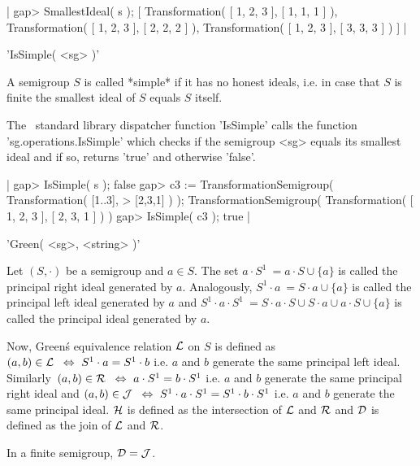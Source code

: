 |  gap> SmallestIdeal( s );
  [ Transformation( [ 1, 2, 3 ], [ 1, 1, 1 ] ), 
    Transformation( [ 1, 2, 3 ], [ 2, 2, 2 ] ), 
    Transformation( [ 1, 2, 3 ], [ 3, 3, 3 ] ) ]
|



'IsSimple( <sg> )'  

A semigroup $S$ is called *simple* if it has no honest ideals, i.e.
in case that $S$ is finite the smallest ideal of $S$ equals $S$ itself. 

The \GAP\ standard library dispatcher function 'IsSimple' calls the 
function 
'sg.\-op\-er\-a\-tions.\-Is\-Simple' which checks if the semigroup 
<sg> equals its smallest ideal and if so, returns 'true' and 
otherwise 'false'.

|  gap> IsSimple( s );                                                    
  false
  gap> c3 := TransformationSemigroup( Transformation( [1..3],            
  >                                   [2,3,1] ) );
  TransformationSemigroup( Transformation( [ 1, 2, 3 ], [ 2, 3, 1 ] ) ) 
  gap> IsSimple( c3 );
  true
|



'Green( <sg>, <string> )'  

Let $(S,\cdot)$ be a semigroup and $a \in S$. The set $a \cdot S^1 \:= 
a \cdot S \cup \{a\}$ is called the principal right ideal generated by $a$.
Analogously, $S^1 \cdot a \:= 
S \cdot a \cup \{a\}$ is called the principal left ideal generated by $a$
and  $S^1 \cdot a \cdot S^1 \:= 
S \cdot a \cdot S \cup S \cdot a \cup a \cdot S \cup \{a\}$ is called 
the principal ideal generated by $a$.

Now, Green\'s equivalence relation ${\cal L}$ on $S$ is defined as\:\
$(a,b) \in {\cal L}\:\ \Leftrightarrow\ S^1 \cdot a = S^1 \cdot b$ i.e. 
$a$ and $b$ generate the same principal left ideal. Similarly\:\
$(a,b) \in {\cal R}\:\ \Leftrightarrow\ a \cdot S^1 = b \cdot S^1$ i.e. 
$a$ and $b$ generate the same principal right ideal and
$(a,b) \in {\cal J}\:\ \Leftrightarrow\ S^1 \cdot a \cdot S^1 = 
S^1 \cdot b \cdot S^1$ i.e. 
$a$ and $b$ generate the same principal ideal. 
${\cal H}$ is defined as the intersection of ${\cal L}$ and ${\cal R}$
and ${\cal D}$ is defined as the join of ${\cal L}$ and ${\cal R}$.

In a finite semigroup, ${\cal D} = {\cal J}$.

